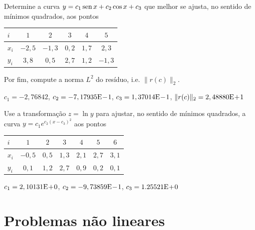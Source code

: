 \begin{exer}\label{exer:mq_curva}
  Determine a curva $y = c_1\operatorname{sen} x + c_2\cos x + c_3$ que melhor se ajusta, no sentido de mínimos quadrados, aos pontos
  \begin{center}
    \begin{tabular}{l|ccccc}
      $i$ & $1$ & $2$ & $3$ & $4$ & $5$ \\\hline
      $x_i$ & $-2,5$ & $-1,3$ & $0,2$ & $1,7$ & $2,3$\\
      $y_i$ & $3,8$ & $0,5$ & $2,7$ & $1,2$ & $-1,3$\\\hline
    \end{tabular}
  \end{center}
Por fim, compute a norma $L^2$ do resíduo, i.e. $\|r(c)\|_2$.
\end{exer}
\begin{resp}
  $c_1 = -2,76842$, $c_2 = -7,17935\mathrm{E}\!-\!1$, $c_3 = 1,37014\mathrm{E}\!-\!1$, $\|r(c)\|_2 = 2,48880\mathrm{E}\!+\!1$
\end{resp}

\begin{exer}\label{exer:mq_nlin0}
  Use a transformação $z = \ln y$ para ajustar, no sentido de mínimos quadrados, a curva $y = c_1e^{c_2(x-c_3)^2}$ aos pontos
  \begin{center}
    \begin{tabular}{l|cccccc}
      $i$ & $1$ & $2$ & $3$ & $4$ & $5$ & $6$ \\\hline
      $x_i$ & $-0,5$ & $0,5$ & $1,3$ & $2,1$ & $2,7$ & $3,1$ \\
      $y_i$ & $0,1$ & $1,2$ & $2,7$ & $0,9$ & $0,2$ & $0,1$ \\\hline
    \end{tabular}
  \end{center}
\end{exer}
\begin{resp}
  $c_1 = 2,10131\mathrm{E}\!+\!0$, $c_2 = -9,73859\mathrm{E}\!-\!1$, $c_3 = 1.25521\mathrm{E}\!+\!0$
\end{resp}
   
\section{Problemas não lineares}\label{cap_ajuste_sec_prob_nlin}

